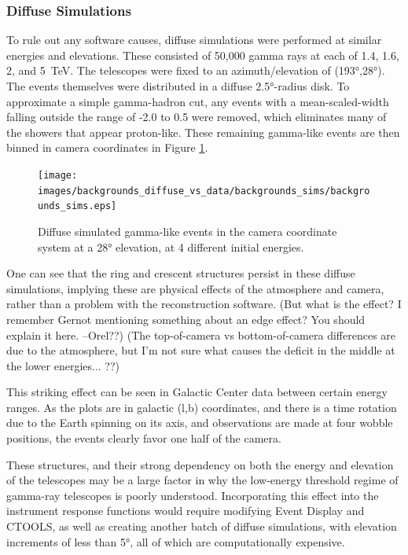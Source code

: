   

  \subsubsection{Diffuse Simulations}\label{subsubsec:diffusesims}
    To rule out any software causes, diffuse simulations were performed at similar energies and elevations.
    These consisted of 50,000 gamma rays at each of 1.4, 1.6, 2, and \SI{5}{\TeV}.
    The telescopes were fixed to an azimuth/elevation of (\ang{193},\ang{28}).
    The events themselves were distributed in a diffuse \ang{2.5}-radius disk.
    To approximate a simple gamma-hadron cut, any events with a mean-scaled-width falling outside the range of -2.0 to 0.5 were removed, which eliminates many of the showers that appear proton-like.
    These remaining gamma-like events are then binned in camera coordinates in Figure \ref{fig:back_simdiffuse}.


    \begin{figure}[ht]
      \centering
      \texttt{[image: images/backgrounds\_diffuse\_vs\_data/backgrounds\_sims/backgrounds\_sims.eps]}
      \caption[Diffuse Simulated Backgrounds]{
        Diffuse simulated gamma-like events in the camera coordinate system at a \ang{28} elevation, at 4 different initial energies.
      }
      \label{fig:back_simdiffuse}
    \end{figure}

    One can see that the ring and crescent structures persist in these diffuse simulations, implying these are physical effects of the atmosphere and camera, rather than a problem with the reconstruction software.
    {\color{red}(But what is the effect? I remember Gernot mentioning something about an edge effect? You should explain it here. --Orel??)}
    {\color{red}(The top-of-camera vs bottom-of-camera differences are due to the atmosphere, but I'm not sure what causes the deficit in the middle at the lower energies... ??)}

    This striking effect can be seen in Galactic Center data between certain energy ranges.
    As the plots are in galactic (l,b) coordinates, and there is a time rotation due to the Earth spinning on its axis, and observations are made at four wobble positions, the events clearly favor one half of the camera.
    
    These structures, and their strong dependency on both the energy and elevation of the telescopes may be a large factor in why the low-energy threshold regime of gamma-ray telescopes is poorly understood.
    Incorporating this effect into the instrument response functions would require modifying Event Display and CTOOLS, as well as creating another batch of diffuse simulations, with elevation increments of less than \ang{5}, all of which are computationally expensive.
    
